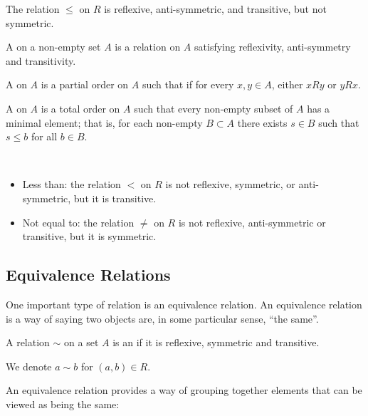 \begin{example}
The relation $\le$ on $R$ is reflexive, anti-symmetric, and transitive, but not symmetric. 
\end{example}

\begin{definition}
A  on a non-empty set $A$ is a relation on $A$ satisfying reflexivity, anti-symmetry and transitivity.

A  on $A$ is a partial order on $A$ such that if for every $x,y\in A$, either $xRy$ or $yRx$.

A  on $A$ is a total order on $A$ such that every non-empty subset of $A$ has a minimal element; that is, for each non-empty $B\subset A$ there exists $s\in B$ such that $s\le b$ for all $b\in B$.
\end{definition}

\begin{example} \
\begin{itemize}
\item Less than: the relation $<$ on $R$ is not reflexive, symmetric, or anti-symmetric, but it is transitive.
\item Not equal to: the relation $\neq$ on $R$ is not reflexive, anti-symmetric or transitive, but it is symmetric.
\end{itemize}
\end{example}

\subsection{Equivalence Relations}
One important type of relation is an equivalence relation. An equivalence relation is a way of saying two objects are, in some particular sense, ``the same''.

\begin{definition}
A relation $\sim$ on a set $A$ is an  if it is reflexive, symmetric and transitive.
\end{definition}

\begin{notation}
We denote $a\sim b$ for $(a,b)\in R$.
\end{notation}

An equivalence relation provides a way of grouping together elements that can be viewed as being the same:

